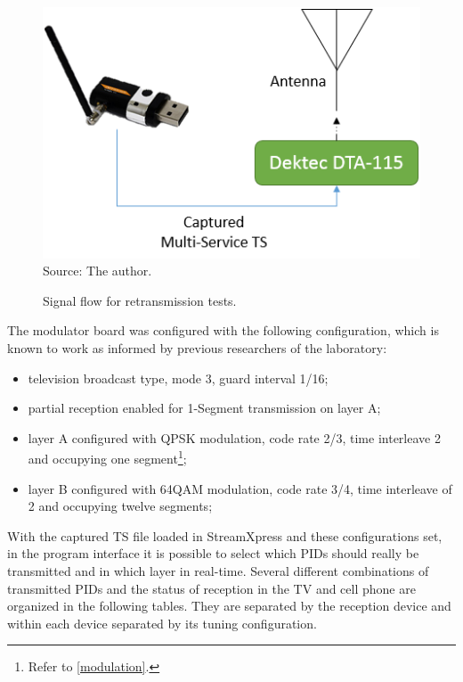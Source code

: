 \documentclass[
	12pt,				%
	openright,			%
	twoside,			%
	a4paper,			%
	brazil,
	french,				%
	english
	]{abntex2}
\begin{document}
\begin{figure}[!h]
\centering
\caption{Signal flow for retransmission tests.}
\includegraphics[width=0.5\linewidth]{figuras/test_scn_retrans.png}
\\Source: The author.
\label{fig:test_scn_retrans}
\end{figure}

The modulator board was configured with the following configuration, which is known to work as informed by previous researchers of the laboratory:

\begin{itemize}
\item television broadcast type, mode 3, guard interval 1/16;
\item partial reception enabled for 1-Segment transmission on layer A;
\item layer A configured with QPSK modulation, code rate 2/3, time interleave 2 and occupying one segment\footnote{\label{footnote_modulation}Refer to \autoref{modulation}.};
\item layer B configured with 64QAM modulation, code rate 3/4, time interleave of 2 and occupying twelve segments\footnotemark[\value{footnote}];
\end{itemize}

With the captured TS file loaded in StreamXpress and these configurations set, in the program interface it is possible to select which PIDs should really be transmitted and in which layer in real-time. Several different combinations of transmitted PIDs and the status of reception in the TV and cell phone are organized in the following tables. They are separated by the reception device and within each device separated by its tuning configuration.
\end{document}
